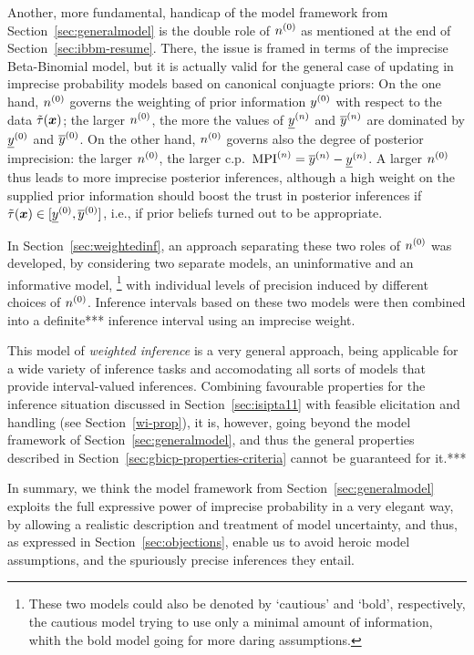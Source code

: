 Another, more fundamental, handicap of the model framework from Section~\ref{sec:generalmodel}
is the double role of $n^{(0)}$ as mentioned at the end of Section~\ref{sec:ibbm-resume}.
There, the issue is framed in terms of the imprecise Beta-Binomial model,
but it is actually valid for the general case of updating
in imprecise probability models based on canonical conjuagte priors:
On the one hand, $n^{(0)}$ governs the weighting of prior information $y^{(0)}$ with
respect to the data $\tilde{\tau}({\bm x})$;
the larger $n^{(0)}$, the more the values of $\underline{y}^{(n)}$ and $\overline{y}^{(n)}$ are dominated by $\underline{y}^{(0)}$ and $\overline{y}^{(0)}$.
On the other hand, $n^{(0)}$ governs also the degree of posterior imprecision:
the larger $n^{(0)}$, the larger c.p.\ ${\rm MPI}^{(n)} = \overline{y}^{(n)} - \underline{y}^{(n)}$.
A larger $n^{(0)}$ thus leads to more imprecise posterior inferences,
although a high weight on the supplied prior information
should boost the trust in posterior inferences if $\tilde{\tau}({\bm x}) \in [\underline{y}^{(0)}, \overline{y}^{(0)}]$,
i.e., if prior beliefs turned out to be appropriate.

In Section~\ref{sec:weightedinf},
an approach separating these two roles of $n^{(0)}$ was developed,
by considering two separate models,
an uninformative and an informative model,%
\footnote{These two models could also be denoted by `cautious' and `bold', respectively,
the cautious model trying to use only a minimal amount of information, %
whith the bold model going for more daring assumptions.}
with individual levels of precision induced by different choices of $n^{(0)}$. 
Inference intervals based on these two models were then combined into a definite*** inference interval
using an imprecise weight.

This model of \emph{weighted inference} is a very general approach,
being applicable for a wide variety of inference tasks and accomodating all sorts of models that provide interval-valued inferences.
Combining favourable properties 
for the inference situation discussed in Section~\ref{sec:isipta11}
with feasible elicitation and handling (see Section~\ref{wi-prop}),
it is, however, going beyond the model framework of Section~\ref{sec:generalmodel},
and thus the general properties described in Section~\ref{sec:gbicp-properties-criteria}
cannot be guaranteed for it.***

\medskip

In summary, we think the model framework from Section~\ref{sec:generalmodel}
exploits the full expressive power of imprecise probability %
in a very elegant way, by allowing a realistic description and treatment
of model uncertainty, and thus, as expressed in Section~\ref{sec:objections},
enable us to avoid heroic model assumptions, and the spuriously precise inferences they entail. 

